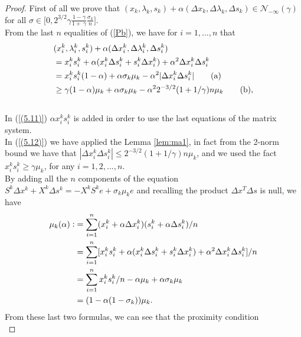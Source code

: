 \documentclass[a4paper,10 pt,titlepage,twoside]{book}
\theoremstyle{plain}
\theoremstyle{definition}
\theoremstyle{remark}
\begin{document}
\begin{proof}
	First of all we prove that $(x_{k}, \lambda_{k}, s_{k})+\alpha(\Delta x_{k},\Delta \lambda_{k},\Delta s_{k})\in\mathcal{N}_{-\infty}(\gamma)$ for all $\sigma \in \bigg[0,2^{3/2}\gamma \frac{1 - \gamma}{1 +\ \gamma}\frac{\sigma_{k}}{n}\bigg]$.\\
	
	From the last $n$ equalities of (\ref{Pb}), we have for $i=1,\dots,n$ that 
	\begin{align}&(x_{i}^{k}, \lambda_{i}^{k}, s_{i}^{k})+\alpha(\Delta x_{i}^{k},\Delta \lambda_{i}^{k},\Delta s_{i}^{k})\notag\\ 
	 &=x_{i}^{k}s_{i}^{k} + \alpha(x_{i}^{k} \Delta s_{i}^{k} + s_{i}^{k} \Delta x_{i}^{k})+\alpha^{2}\Delta x_{i}^{k} \Delta s_{i}^{k}\notag\\
	&=x_{i}^{k}s_{i}^{k}(1 - \alpha) + \alpha \sigma_{k}\mu_{k}-\alpha^{2}|\Delta x_{i}^{k} \Delta s_{i}^{k}| \label{(5.11)}\tag{a}\\
	&\geq \gamma(1 - \alpha)\mu_{k} + \alpha \sigma_{k}\mu_{k}-\alpha^{2}2^{-3/2}(1 + 1/ \gamma)n\mu_{k} \label{(5.12)}\tag{b},
	\end{align}
	\\
	In (\ref{(5.11)}) $\alpha x_{i}^{k}s_{i}^{k}$ is added in order to use the last equations of the matrix system.\\ 
	In (\ref{(5.12)}) we have applied the Lemma \ref{lem:ma1}, in fact from the 2-norm bound we have that $|\Delta x_{i}^{k}\Delta s_{i}^{k}|\leq2^{-3/2}(1 + 1/\gamma)n\mu_{k}$, and we used the fact $x_{i}^{k}s_{i}^{k}\geq \gamma\mu_{k}$, for any $i = 1,2,...,n$. \\
	By adding all the $n$ components of the equation $S^{k}\Delta x^{k} + X^{k} \Delta s^{k} = -X^{k}S^{k}e + \sigma_{k} \mu_{k}e$ and recalling the product $\Delta x^{T} \Delta s$ is null, we have
	\begin{align*}\mu_{k}(\alpha)\vcentcolon&=\sum_{i=1}^{n}(x_{i}^{k} + \alpha\Delta x_{i}^{k})(s_{i}^{k} + \alpha\Delta s_{i}^{k})/n\\
&=\sum_{i=1}^{n}[x_{i}^{k}s_{i}^{k}+\alpha(x_{i}^{k}\Delta s_{i}^{k} + s_{i}^{k}\Delta x_{i}^{k}) +\alpha^{2}\Delta x_{i}^{k}\Delta s_{i}^{k}]/n\\
	&=\sum_{i=1}^{n}x_{i}^{k}s_{i}^{k}/n - \alpha \mu_{k}+\alpha \sigma_{k} \mu_{k} \\
	&=(1-\alpha(1-\sigma_{k}))\mu_{k}.
	\end{align*}
	From these last two formulas, we can see that the proximity condition
	\begin{equation*}

\end{equation*}
\end{proof}
\end{document}
